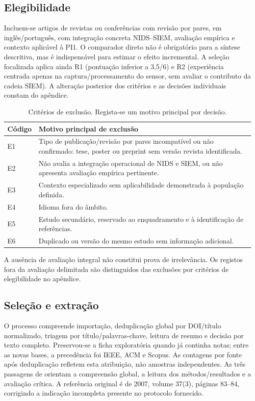 \documentclass[11pt,a4paper]{article}
\begin{document}
\subsection{Elegibilidade}
Incluem-se artigos de revistas ou conferências com revisão por pares, em inglês/português, com integração concreta NIDS--SIEM, avaliação empírica e contexto aplicável à PI1. O comparador direto não é obrigatório para a síntese descritiva, mas é indispensável para estimar o efeito incremental. A seleção focalizada aplica ainda R1 (pontuação inferior a 3,5/6) e R2 (experiência centrada apenas na captura/processamento do sensor, sem avaliar o contributo da cadeia SIEM). A alteração posterior dos critérios e as decisões individuais constam do apêndice.
\begin{table}[H]\centering\small
\begin{tabularx}{\linewidth}{@{}P{1.2cm}Y@{}}\toprule
Código & Motivo principal de exclusão\\\midrule
E1 & Tipo de publicação/revisão por pares incompatível ou não confirmado: tese, poster ou preprint sem versão revista identificada.\\
E2 & Não avalia a integração operacional de NIDS e SIEM, ou não apresenta avaliação empírica pertinente.\\
E3 & Contexto especializado sem aplicabilidade demonstrada à população definida.\\
E4 & Idioma fora do âmbito.\\
E5 & Estudo secundário, reservado ao enquadramento e à identificação de referências.\\
E6 & Duplicado ou versão do mesmo estudo sem informação adicional.\\\bottomrule
\end{tabularx}\caption{Critérios de exclusão. Regista-se um motivo principal por decisão.}\end{table}
A ausência de avaliação integral não constitui prova de irrelevância. Os registos fora da avaliação delimitada são distinguidos das exclusões por critérios de elegibilidade no apêndice.

\subsection{Seleção e extração}
O processo compreende importação, deduplicação global por DOI/título normalizado, triagem por título/palavras-chave, leitura de resumo e decisão por texto completo. Preservou-se a ficha exploratória quando já continha notas; entre as novas bases, a precedência foi IEEE, ACM e Scopus. As contagens por fonte após deduplicação refletem esta atribuição, não amostras independentes. As três passagens de \citet{keshav2007} orientam a compreensão global, a leitura dos métodos/resultados e a avaliação crítica. A referência original é de 2007, volume 37(3), páginas 83--84, corrigindo a indicação incompleta presente no protocolo fornecido.
\end{document}

